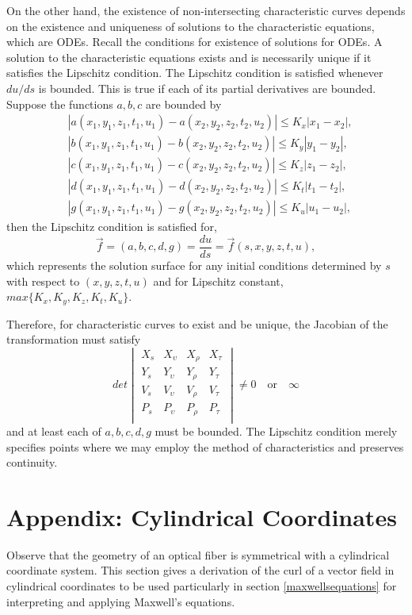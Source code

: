 \documentclass[12pt]{article}
\theoremstyle{definition}
\numberwithin{equation}{section}
\begin{document}
{On the other hand, the existence of non-intersecting characteristic curves depends on the existence and uniqueness of solutions to the characteristic equations, which are ODEs. Recall the conditions for existence of solutions for ODEs. A solution to the characteristic equations exists and is necessarily unique if it satisfies the Lipschitz condition. The Lipschitz condition is satisfied whenever $du\slash ds$ is bounded. This is true if each of its partial derivatives are bounded. Suppose the functions $a,b,c$ are bounded by
\begin{align}
&|a(x_1,y_1,z_1,t_1,u_1)-a(x_2,y_2,z_2,t_2,u_2)|\leq K_x|x_1-x_2|,\\
&|b(x_1,y_1,z_1,t_1,u_1)-b(x_2,y_2,z_2,t_2,u_2)|\leq K_y|y_1-y_2|,\\
&|c(x_1,y_1,z_1,t_1,u_1)-c(x_2,y_2,z_2,t_2,u_2)|\leq K_z|z_1-z_2|,\\
&|d(x_1,y_1,z_1,t_1,u_1)-d(x_2,y_2,z_2,t_2,u_2)|\leq K_t|t_1-t_2|,\\
&|g(x_1,y_1,z_1,t_1,u_1)-g(x_2,y_2,z_2,t_2,u_2)|\leq K_u|u_1-u_2|,
\end{align}
then the Lipschitz condition is satisfied for,
$$\vec{f}=(a,b,c,d,g)=\frac{du}{ds}=\vec{f}(s,x,y,z,t,u),$$ which represents the solution surface for any initial conditions determined by $s$ with respect to $(x,y,z,t,u)$ and for Lipschitz constant, $max\{K_x,K_y,K_z,K_t,K_u\}$.

Therefore, for characteristic curves to exist and be unique, the Jacobian of the transformation must satisfy
\begin{equation}
det\begin{vmatrix}X_s&X_\upsilon &X_\rho &X_\tau\\ Y_s&Y_\upsilon &Y_\rho &Y_\tau\\ V_s&V_\upsilon &V_\rho&V_\tau\\ P_s&P_\upsilon &P_\rho &P_\tau\\ \end{vmatrix}\neq 0\quad\mbox{or}\quad\infty
\end{equation}
and at least each of $a,b,c,d,g$ must be bounded. The Lipschitz condition merely specifies points where we may employ the method of characteristics and preserves continuity.
\section{Appendix: Cylindrical Coordinates}\label{C.app}
Observe that the geometry of an optical fiber is symmetrical with a cylindrical coordinate system. This section gives a derivation of the curl of a vector field in cylindrical coordinates to be used particularly in section \ref{maxwellsequations} for interpreting and applying Maxwell's equations.

}
\end{document}
